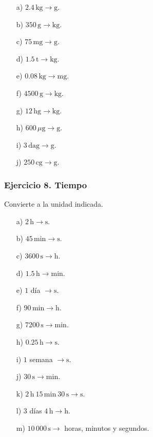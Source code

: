 \begin{enumerate}
    \item[a)] $2.4\,\mathrm{kg}\rightarrow\mathrm{g}$.
    \item[b)] $350\,\mathrm{g}\rightarrow\mathrm{kg}$.
    \item[c)] $75\,\mathrm{mg}\rightarrow\mathrm{g}$.
    \item[d)] $1.5\,\mathrm{t}\rightarrow\mathrm{kg}$.
    \item[e)] $0.08\,\mathrm{kg}\rightarrow\mathrm{mg}$.
    \item[f)] $4500\,\mathrm{g}\rightarrow\mathrm{kg}$.
    \item[g)] $12\,\mathrm{hg}\rightarrow\mathrm{kg}$.
    \item[h)] $600\,\mu\mathrm{g}\rightarrow\mathrm{g}$.
    \item[i)] $3\,\mathrm{dag}\rightarrow\mathrm{g}$.
    \item[j)] $250\,\mathrm{cg}\rightarrow\mathrm{g}$.
\end{enumerate}

\subsubsection*{Ejercicio 8. Tiempo}

Convierte a la unidad indicada.

\begin{enumerate}
    \item[a)] $2\,\mathrm{h}\rightarrow\mathrm{s}$.
    \item[b)] $45\,\mathrm{min}\rightarrow\mathrm{s}$.
    \item[c)] $3600\,\mathrm{s}\rightarrow\mathrm{h}$.
    \item[d)] $1.5\,\mathrm{h}\rightarrow\mathrm{min}$.
    \item[e)] $1$ día $\rightarrow\mathrm{s}$.
    \item[f)] $90\,\mathrm{min}\rightarrow\mathrm{h}$.
    \item[g)] $7200\,\mathrm{s}\rightarrow\mathrm{min}$.
    \item[h)] $0.25\,\mathrm{h}\rightarrow\mathrm{s}$.
    \item[i)] $1$ semana $\rightarrow\mathrm{s}$.
    \item[j)] $30\,\mathrm{s}\rightarrow\mathrm{min}$.
    \item[k)] $2\,\mathrm{h}\ 15\,\mathrm{min}\ 30\,\mathrm{s}
    \rightarrow\mathrm{s}$.
    \item[l)] $3$ días $4\,\mathrm{h}\rightarrow\mathrm{h}$.
    \item[m)] $10\,000\,\mathrm{s}\rightarrow$
    horas, minutos y segundos.
\end{enumerate}

